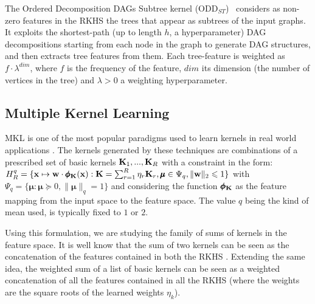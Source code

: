 \documentclass{esannV2}
\newcommand{\xx}{{\bf x}}
\newcommand{\KK}{{\bf K}}
\newcommand{\1}{{\bf 1}}
\newcommand{\mmu}{\pmb{\mu}}
\newcommand{\pphi}{\pmb{\phi}}
\begin{document}
The Ordered Decomposition DAGs Subtree kernel (ODD$_{ST}$)~\cite{DaSanMartino2016} considers as non-zero features in the RKHS the trees that appear as subtrees of the input graphs.
It exploits the shortest-path (up to length $h$, a hyperparameter) DAG decompositions starting from each node in the graph to generate DAG structures, and then extracts tree features from them.
Each tree-feature is weighted as $f \cdot \lambda^{dim}$, where $f$ is the frequency of the feature, $dim$ its dimension (the number of vertices in the tree) and $\lambda>0$ a weighting hyperparameter.

\subsection{Multiple Kernel Learning}
\label{MKL}
MKL \cite{Gonen2011} is one of the most popular paradigms used to learn kernels in real world applications \cite{Bucak2014}. %
The kernels generated by these techniques are combinations of a prescribed set of basic kernels $\KK_1,...,\KK_R$ with a constraint in the form:
$
	H_R^q = \{ \xx \mapsto \textbf{w} \cdot \pphi_\KK(\xx) : \KK = \sum_{r=1}^R \eta_r \KK_r, \mmu \in \Psi_q, \|\textbf{w}\|_2 \leqslant 1 \}
$
with $\Psi_q = \{ \mmu : \mmu \succcurlyeq 0, \| \mmu \|_q = 1 \}$ and considering the function $\pphi_\KK$ as the feature mapping from the input space to the feature space. The value $q$ being the kind of mean used, is typically fixed to $1$ or $2$.

Using this formulation, we are studying the family of sums of kernels in the feature space. It is well know that the sum of two kernels can be seen as the concatenation of the features contained in both the RKHS \cite{Shawe-Taylor2004}. Extending the same idea, the weighted sum of a list of basic kernels can be seen as a weighted concatenation of all the features contained in all the RKHS (where the weights are the square roots of the learned weights $\eta_k$).

\end{document}
